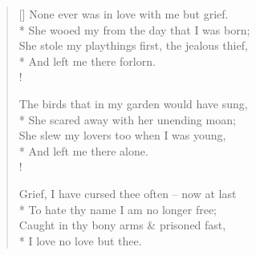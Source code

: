 \documentclass[MAIN]{subfiles}
\begin{document}
\settowidth{\versewidth}{She stole my playthings first, the jealous thief,}
\begin{verse}[\versewidth]
None ever was in love with me but grief.\\*
\vin She wooed my from the day that I was born;\\
She stole my playthings first, the jealous thief,\\*
\vin \vin And left me there forlorn.\\!

The birds that in my garden would have sung,\\*
\vin She scared away with her unending moan;\\
She slew my lovers too when I was young,\\*
\vin \vin And left me there alone.\\!

Grief, I have cursed thee often -- now at last\\*
\vin To hate thy name I am no longer free;\\
Caught in thy bony arms \& prisoned fast,\\*
\vin \vin I love no love but thee.
\end{verse}
\end{document}
